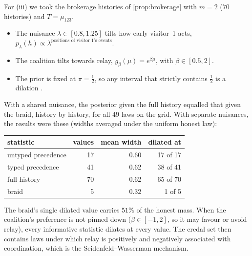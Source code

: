 \documentclass[11pt]{article}
\theoremstyle{definition}\newtheorem{definition}[theorem]{Definition}\newtheorem{remark}[theorem]{Remark}\newtheorem{example}[theorem]{Example}\newtheorem{problem}[theorem]{Open problem}\crefname{problem}{Problem}{Problems}
\begin{document}
For (iii) we took the brokerage histories of \cref{prop:brokerage} with $m=2$ ($70$ histories) and $T=\mu_{123}$.
\begin{itemize}
\item The nuisance $\lambda\in[0.8,1.25]$ tilts how early visitor~1 acts, $p_\lambda(h)\propto\lambda^{\text{positions of visitor 1's events}}$.
\item The coalition tilts towards relay, $g_\beta(\mu)=e^{\beta\mu}$, with $\beta\in[0.5,2]$.
\item The prior is fixed at $\pi=\tfrac12$, so any interval that strictly contains $\tfrac12$ is a dilation \cite{SeidenfeldWasserman1993}.
\end{itemize}
With a shared nuisance, the posterior given the full history equalled that given the braid, history by history, for all $49$ laws on the grid. With separate nuisances, the results were these (widths averaged under the uniform honest law):

\begin{center}
\begin{tabular}{lrrr}
statistic & values & mean width & dilated at \\ \hline
untyped precedence & 17 & 0.60 & 17 of 17 \\
typed precedence & 41 & 0.62 & 38 of 41 \\
full history & 70 & 0.62 & 65 of 70 \\
braid & 5 & 0.32 & 1 of 5 \\
\end{tabular}
\end{center}

The braid's single dilated value carries $51\%$ of the honest mass. When the coalition's preference is not pinned down ($\beta\in[-1,2]$, so it may favour or avoid relay), every informative statistic dilates at every value. The credal set then contains laws under which relay is positively and negatively associated with coordination, which is the Seidenfeld--Wasserman mechanism.
\end{document}
